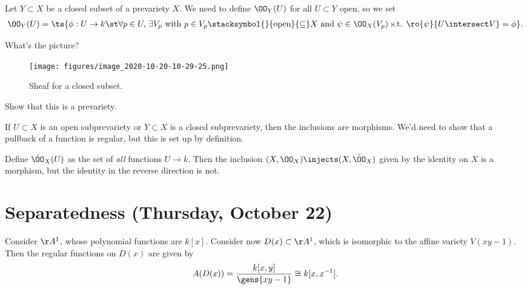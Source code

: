 \begin{example}

Let \(Y\subset X\) be a closed subset of a prevariety \(X\). We need to
define \(\OO_Y(U)\) for all \(U\subset Y\) open, so we set
\begin{align*}  
\OO_Y(U) = \ts{\phi: U\to k \st \forall p\in U, \, \exists V_p \text{ with } p\in V_p \stacksymbol{}{\text{open}}{\subseteq} X \text{ and } \psi\in \OO_X(V_p) \text{ s.t. } \ro{\psi}{U\intersect V} = \phi  }
.\end{align*}

What's the picture?

\begin{figure}
\centering
\texttt{[image: figures/image\_2020-10-20-10-29-25.png]}
\caption{Sheaf for a closed subset.}
\end{figure}

\end{example}

\begin{exercise}[?]

Show that this is a prevariety.

\end{exercise}

\begin{remark}

If \(U\subset X\) is an open subprevariety or \(Y\subset X\) is a closed
subprevariety, then the inclusions are morphisms. We'd need to show that
a pullback of a function is regular, but this is set up by definition.

\end{remark}

\begin{remark}

Define \(\tilde \OO_X(U)\) as the set of \emph{all} functions
\(U\to k\). Then the inclusion \((X, \OO_X) \injects (X, \tilde \OO_X)\)
given by the identity on \(X\) is a morphism, but the identity in the
reverse direction is not.

\end{remark}

\hypertarget{separatedness-thursday-october-22}{%
\section{Separatedness (Thursday, October
22)}\label{separatedness-thursday-october-22}}

\begin{example}

Consider \(\AA^1\), whose polynomial functions are \(k[x]\). Consider
now \(D(x) \subset \AA^1\), which is isomorphic to the affine variety
\(V(xy-1)\). Then the regular functions on \(D(x)\) are given by
\begin{align*}  
A(D(x)) = 
\frac{ k[x, y] }{ \gens{xy-1} } \cong k[x, x^{-1} ]
.\end{align*}

\end{example}

